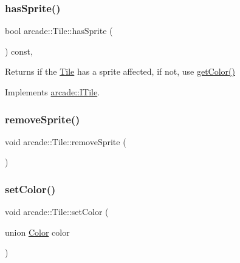 \subsubsection{\texorpdfstring{has\+Sprite()}{hasSprite()}}
{\footnotesize\ttfamily bool arcade\+::\+Tile\+::has\+Sprite (\begin{DoxyParamCaption}{ }\end{DoxyParamCaption}) const\hspace{0.3cm}{\ttfamily [override]}, {\ttfamily [virtual]}}



Returns if the \hyperlink{classarcade_1_1_tile}{Tile} has a sprite affected, if not, use \hyperlink{classarcade_1_1_tile_a33f158dcb0b991ca565562a41ede70ba}{get\+Color()} 



Implements \hyperlink{classarcade_1_1_i_tile_ab2d6a5f8d4cfc6c606b8ad13d8dd88a4}{arcade\+::\+I\+Tile}.

\mbox{\label{classarcade_1_1_tile_a47d0874b2b1f02719574d1cae49e7a05}} 
\subsubsection{\texorpdfstring{remove\+Sprite()}{removeSprite()}}
{\footnotesize\ttfamily void arcade\+::\+Tile\+::remove\+Sprite (\begin{DoxyParamCaption}{ }\end{DoxyParamCaption})}

\mbox{\label{classarcade_1_1_tile_a07d360acc6d893cc23f972cf9bdb9c8c}} 
\subsubsection{\texorpdfstring{set\+Color()}{setColor()}}
{\footnotesize\ttfamily void arcade\+::\+Tile\+::set\+Color (\begin{DoxyParamCaption}\item[{union \hyperlink{unionarcade_1_1_color}{Color}}]{color }\end{DoxyParamCaption})}

\mbox{\label{classarcade_1_1_tile_a6fbee0e9aec15f1ee8b723776d67d2b4}} 
